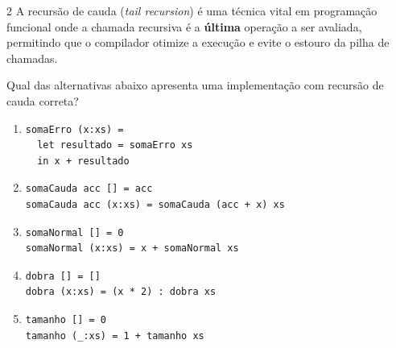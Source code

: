 \documentclass[a4paper,10pt,brazil]{article}
\begin{document}
\begin{multicols}{2}
A recursão de cauda (\emph{tail recursion}) é uma técnica vital em programação funcional onde a chamada recursiva é a \textbf{última} operação a ser avaliada, permitindo que o compilador otimize a execução e evite o estouro da pilha de chamadas. 

Qual das alternativas abaixo apresenta uma implementação com recursão de cauda correta?

\begin{enumerate}
  \item \begin{verbatim}
somaErro (x:xs) = 
  let resultado = somaErro xs 
  in x + resultado
\end{verbatim}

  \item \begin{verbatim}
somaCauda acc [] = acc
somaCauda acc (x:xs) = somaCauda (acc + x) xs
\end{verbatim}

  \item \begin{verbatim}
somaNormal [] = 0
somaNormal (x:xs) = x + somaNormal xs
\end{verbatim}

  \item \begin{verbatim}
dobra [] = []
dobra (x:xs) = (x * 2) : dobra xs
\end{verbatim}

  \item \begin{verbatim}
tamanho [] = 0
tamanho (_:xs) = 1 + tamanho xs
\end{verbatim}


\end{enumerate}


\end{multicols}
\end{document}
